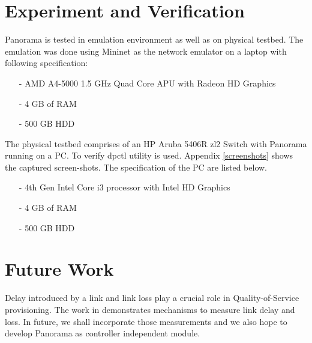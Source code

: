 \documentclass[11pt,a4paper]{report}
\begin{document}
	\chapter{Experiment and Verification}
	
	Panorama is tested in emulation environment as well as on physical testbed. The emulation was done using Mininet as the network emulator on a laptop with following specification: 
	\begin{itemize}
		\item[-] AMD A4-5000 1.5 GHz Quad Core APU with Radeon HD Graphics
		\item[-] 4 GB of RAM
		\item[-] 500 GB HDD 
	\end{itemize}

	The physical testbed comprises of an HP Aruba 5406R zl2 Switch with Panorama running on a PC. To verify dpctl \cite{dpctl} utility is used. Appendix \ref{screenshots} shows the captured screen-shots. The specification of the PC are listed below.
	
	\begin{itemize}
		\item[-] 4th Gen Intel Core i3 processor with Intel HD Graphics
		\item[-] 4 GB of RAM
		\item[-] 500 GB HDD
	\end{itemize}
	
	\chapter{Future Work}
		Delay introduced by a link and link loss play a crucial role in Quality-of-Service provisioning. The work in \cite{gourov2013network} demonstrates mechanisms to measure link delay and loss. In future, we shall incorporate those measurements and we also hope to develop Panorama as controller independent module.
\end{document}
